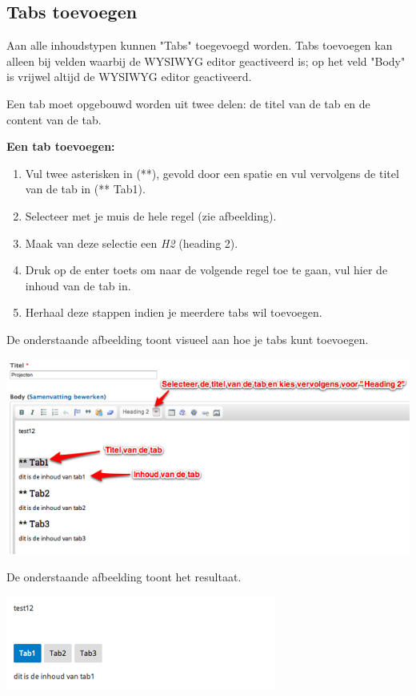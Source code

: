 \subsection{Tabs toevoegen}\label{tabstoevoegen}
Aan alle inhoudstypen kunnen "Tabs" toegevoegd worden. 
Tabs toevoegen kan alleen bij velden waarbij de WYSIWYG  editor geactiveerd is; op het veld "Body" is vrijwel altijd de WYSIWYG editor geactiveerd.

Een tab moet opgebouwd worden uit twee delen: de titel van de tab en de content van de tab.

\textbf{Een tab toevoegen:} 

\begin{enumerate}
\item Vul twee asterisken in (**), gevold door een spatie en vul vervolgens de titel van de tab in (** Tab1).
\item Selecteer met je muis de hele regel (zie afbeelding).
\item Maak van deze selectie een \emph{H2} (heading 2).
\item Druk op de enter toets om naar de volgende regel toe te gaan, vul hier de inhoud van de tab in.
\item Herhaal deze stappen indien je meerdere tabs wil toevoegen.
\end{enumerate}

De onderstaande afbeelding toont visueel aan hoe je tabs kunt toevoegen.

\begin{center}
	\includegraphics[width=\textwidth]{img/tabs1}
\end{center}

De onderstaande afbeelding toont het resultaat.

\begin{center}
	\includegraphics[width=\textwidth]{img/tabs2}
\end{center}